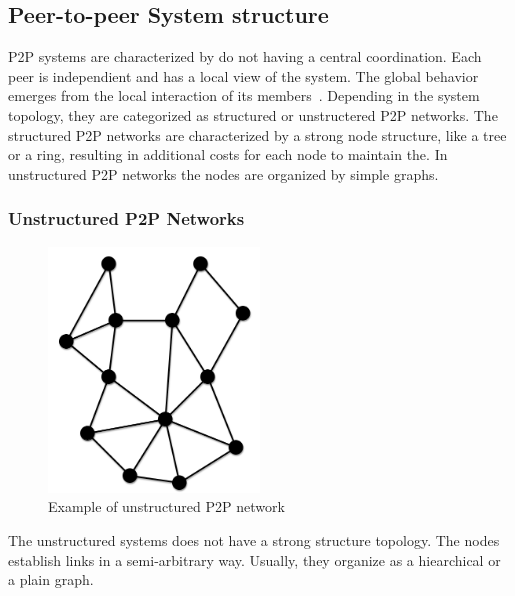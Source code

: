 \subsection{Peer-to-peer System structure}
\label{sec:p2p_estructure}

P2P systems are characterized by do not having a central coordination. Each
peer is independient and has a local view of the system. The global behavior
emerges from the local interaction of its members~\cite{Aberer:2001:PIS:503271.503268}.
Depending in the system topology, they are categorized as structured or
unstructered P2P networks. The structured P2P networks are characterized by a
strong node structure, like a tree or a ring, resulting in additional costs for
each node to maintain the. In unstructured P2P networks the nodes are organized
by simple graphs.

\subsubsection{Unstructured P2P Networks}
\label{sec:p2p_unstructured}

\begin{figure}
\center
\includegraphics[width=0.5\textwidth]{img/p2p-unstructured}
\caption{Example of unstructured P2P network}
\label{fig:p2p_unstructured}
\end{figure}

The unstructured systems does not have a strong structure topology. The nodes
establish links in a semi-arbitrary way. Usually, they organize as a hiearchical or a
plain graph.

